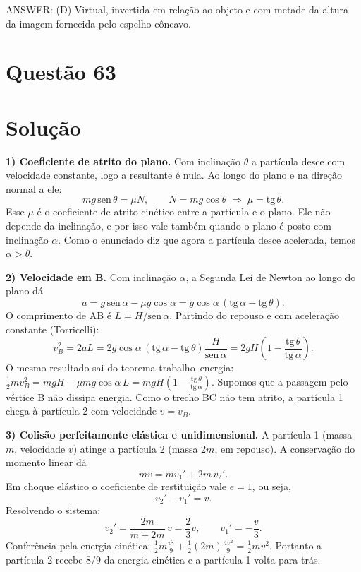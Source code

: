 \documentclass{article}%
\begin{document}
ANSWER: (D) Virtual, invertida em relação ao objeto e com metade da altura da imagem fornecida pelo espelho côncavo.%
\newpage%
\section*{Questão 63}

\section*{Solução}

\textbf{1) Coeficiente de atrito do plano.} Com inclinação $\theta$ a partícula desce com velocidade constante, logo a resultante é nula. Ao longo do plano e na direção normal a ele:
\[
mg\,\text{sen}\,\theta = \mu N,\qquad N = mg\cos\theta \;\Longrightarrow\; \mu = \text{tg}\,\theta .
\]
Esse $\mu$ é o coeficiente de atrito cinético entre a partícula e o plano. Ele não depende da inclinação, e por isso vale também quando o plano é posto com inclinação $\alpha$. Como o enunciado diz que agora a partícula desce acelerada, temos $\alpha>\theta$.

\textbf{2) Velocidade em B.} Com inclinação $\alpha$, a Segunda Lei de Newton ao longo do plano dá
\[
a = g\,\text{sen}\,\alpha - \mu g\cos\alpha = g\cos\alpha\,(\text{tg}\,\alpha - \text{tg}\,\theta).
\]
O comprimento de AB é $L = H/\text{sen}\,\alpha$. Partindo do repouso e com aceleração constante (Torricelli):
\[
v_B^2 = 2aL = 2g\cos\alpha\,(\text{tg}\,\alpha-\text{tg}\,\theta)\frac{H}{\text{sen}\,\alpha}
= 2gH\left(1-\frac{\text{tg}\,\theta}{\text{tg}\,\alpha}\right).
\]
O mesmo resultado sai do teorema trabalho--energia: $\tfrac12 mv_B^2 = mgH - \mu mg\cos\alpha\,L = mgH\left(1-\tfrac{\text{tg}\,\theta}{\text{tg}\,\alpha}\right)$. Supomos que a passagem pelo vértice B não dissipa energia. Como o trecho BC não tem atrito, a partícula 1 chega à partícula 2 com velocidade $v = v_B$.

\textbf{3) Colisão perfeitamente elástica e unidimensional.} A partícula 1 (massa $m$, velocidade $v$) atinge a partícula 2 (massa $2m$, em repouso). A conservação do momento linear dá
\[
mv = mv_1' + 2m\,v_2'.
\]
Em choque elástico o coeficiente de restituição vale $e=1$, ou seja,
\[
v_2' - v_1' = v.
\]
Resolvendo o sistema:
\[
v_2' = \frac{2m}{m+2m}\,v = \frac{2}{3}v,\qquad v_1' = -\frac{v}{3}.
\]
Conferência pela energia cinética: $\tfrac12 m\tfrac{v^2}{9} + \tfrac12(2m)\tfrac{4v^2}{9} = \tfrac12 mv^2$. Portanto a partícula 2 recebe $8/9$ da energia cinética e a partícula 1 volta para trás.
\end{document}
